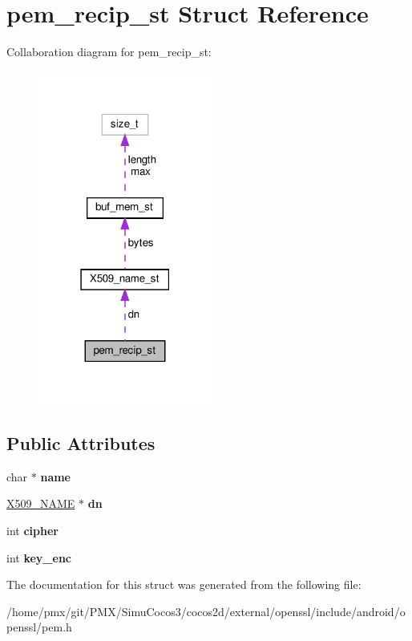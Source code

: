 \hypertarget{structpem__recip__st}{}\section{pem\+\_\+recip\+\_\+st Struct Reference}
\label{structpem__recip__st}


Collaboration diagram for pem\+\_\+recip\+\_\+st\+:
\nopagebreak
\begin{figure}[H]
\begin{center}
\leavevmode
\includegraphics[width=162pt]{structpem__recip__st__coll__graph}
\end{center}
\end{figure}
\subsection*{Public Attributes}
\begin{DoxyCompactItemize}
\item 
\mbox{\label{structpem__recip__st_aa4d13fe3383f4855842a75ec50a705f0}} 
char $\ast$ {\bfseries name}
\item 
\mbox{\label{structpem__recip__st_aedd0a24373adfcc44ff6dab5aa5aba1e}} 
\hyperlink{structX509__name__st}{X509\+\_\+\+N\+A\+ME} $\ast$ {\bfseries dn}
\item 
\mbox{\label{structpem__recip__st_aacc99505c76644287f2b94c986349f16}} 
int {\bfseries cipher}
\item 
\mbox{\label{structpem__recip__st_a10d41030c038defd986f740d1663b831}} 
int {\bfseries key\+\_\+enc}
\end{DoxyCompactItemize}


The documentation for this struct was generated from the following file\+:\begin{DoxyCompactItemize}
\item 
/home/pmx/git/\+P\+M\+X/\+Simu\+Cocos3/cocos2d/external/openssl/include/android/openssl/pem.\+h\end{DoxyCompactItemize}
